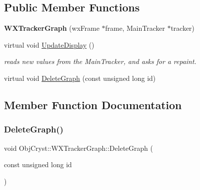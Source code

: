 \subsection*{Public Member Functions}
\begin{DoxyCompactItemize}
\item 
\mbox{\label{class_obj_cryst_1_1_w_x_tracker_graph_ac7ee735d6b5f228eb3dfbb1e455835cc}} 
{\bfseries W\+X\+Tracker\+Graph} (wx\+Frame $\ast$frame, Main\+Tracker $\ast$tracker)
\item 
\mbox{\label{class_obj_cryst_1_1_w_x_tracker_graph_a5e397fdb8d1a06d43311fe9fa0895fe2}} 
virtual void \mbox{\hyperlink{class_obj_cryst_1_1_w_x_tracker_graph_a5e397fdb8d1a06d43311fe9fa0895fe2}{Update\+Display}} ()
\begin{DoxyCompactList}\small\item\em reads new values from the Main\+Tracker, and asks for a repaint. \end{DoxyCompactList}\item 
virtual void \mbox{\hyperlink{class_obj_cryst_1_1_w_x_tracker_graph_af36c19c220ac18f46ff11954ed695686}{Delete\+Graph}} (const unsigned long id)
\end{DoxyCompactItemize}


\subsection{Member Function Documentation}
\mbox{\label{class_obj_cryst_1_1_w_x_tracker_graph_af36c19c220ac18f46ff11954ed695686}} 
\subsubsection{\texorpdfstring{DeleteGraph()}{DeleteGraph()}}
{\footnotesize\ttfamily void Obj\+Cryst\+::\+W\+X\+Tracker\+Graph\+::\+Delete\+Graph (\begin{DoxyParamCaption}\item[{const unsigned long}]{id }\end{DoxyParamCaption})\hspace{0.3cm}{\ttfamily [virtual]}}

